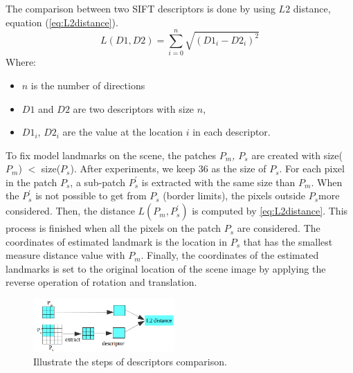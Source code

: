 \documentclass[twoside,twocolumn,10pt]{article}
\begin{document}
The comparison between two SIFT descriptors is done by using $L2$ distance, equation (\ref{eq:L2distance}).
\begin{equation}
\label{eq:L2distance}
	L(D1,D2) = \sum\limits_{i = 0}^{n}\sqrt{(D1_i-D2_i)^2}
\end{equation}
Where:
\begin{itemize}
	\item $n$ is the number of directions
	\item $D1$ and $D2$ are two descriptors with size $n$,
	\item  $D1_i$, $D2_i $ are the value at the location $i$ in each descriptor.
\end{itemize}
To fix model landmarks on the scene, the patches \textit{$P_m$, $P_s$} are created with size($P_m$) $<$ size($P_s$). After experiments, we keep 36 as the size of \textit{$P_s$}. For each pixel in the patch \textit{$P_s$}, a sub-patch \textit{$P^{'}_s$} is extracted with the same size than \textit{$P_m$}. When the \textit{$P^{'}_s$} is not possible to get from \textit{$P_s$} (border limits), the pixels outside \textit{$P_s$}more considered. Then, the distance \textit{$L(P_m,P^{'}_s)$} is computed by \ref{eq:L2distance}. This process is finished when all the pixels on the patch \textit{$P_s$} are considered. The coordinates of estimated landmark is the location in \textit{$P_s$} that has the smallest measure distance value with \textit{$P_m$}. Finally, the coordinates of the estimated landmarks is set to the original location of the scene image by applying the reverse operation of rotation and translation.
\begin{figure}[htb]
    \centering
    \includegraphics[width=0.48\textwidth]{./images/illustration_SIFT}
    \caption{Illustrate the steps of descriptors comparison.}
    \label{fig:Illustrate}
\end{figure}
\end{document}

